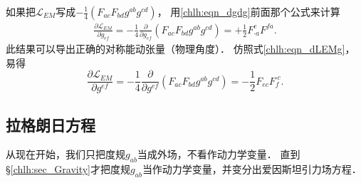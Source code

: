 如果把$\mathscr{L}_{EM}$写成$-\frac{1}{4}\left(F_{ac} F_{bd} g^{ab} g^{cd} \right)$，
用\eqref{chlh:eqn_dgdg}前面那个公式来计算
\begin{align}
    \frac{\partial \mathscr{L}_{EM}}{\partial g_{ef}} = -\frac{1}{4}
    \frac{\partial }{\partial g_{ef}}\left(F_{ac} F_{bd} g^{ab} g^{cd} \right)  %
    = +\frac{1}{2}   F_{\cdot a}^e F^{f a} . \label{chlh:eqn_dLEMg}
\end{align}
此结果可以导出正确的对称能动张量（物理角度）．
仿照式\eqref{chlh:eqn_dLEMg}，易得
\begin{equation}\label{chlh:eqn_dLEMgup}
    \frac{\partial \mathscr{L}_{EM}}{\partial g^{ef}} = -\frac{1}{4}
    \frac{\partial }{\partial g^{ef}}\left(F_{ac} F_{bd} g^{ab} g^{cd} \right) 
    = -\frac{1}{2}   F_{ec} F_{f}^{\cdot c} . 
\end{equation}


\subsection{拉格朗日方程}\label{chlh:sec_lagrange}

从现在开始，我们只把度规$g_{ab}$当成外场，不看作动力学变量．
直到\S\ref{chlh:sec_Gravity}才把度规$g_{ab}$当作动力学变量，并变分出爱因斯坦引力场方程．

